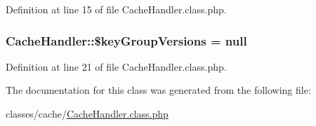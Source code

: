 Definition at line 15 of file Cache\+Handler.\+class.\+php.

\subsubsection[{\texorpdfstring{\$key\+Group\+Versions}{$keyGroupVersions}}]{\setlength{\rightskip}{0pt plus 5cm}Cache\+Handler\+::\$key\+Group\+Versions = {\bf null}}\hypertarget{classCacheHandler_a1e71d92d2d7a76b72b3415389bbcaf60}{}\label{classCacheHandler_a1e71d92d2d7a76b72b3415389bbcaf60}


Definition at line 21 of file Cache\+Handler.\+class.\+php.



The documentation for this class was generated from the following file\+:\begin{DoxyCompactItemize}
\item 
classes/cache/\hyperlink{CacheHandler_8class_8php}{Cache\+Handler.\+class.\+php}\end{DoxyCompactItemize}
